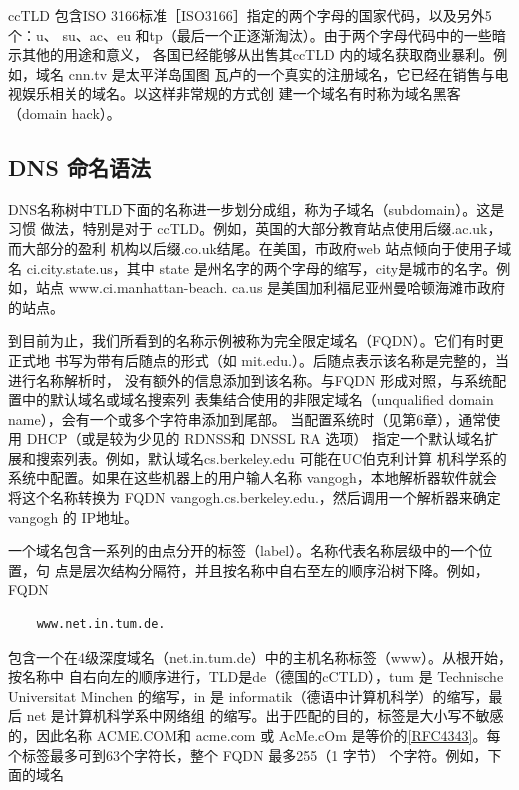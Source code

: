 
ccTLD 包含ISO 3166标准［ISO3166］指定的两个字母的国家代码，以及另外5个：u、
su、ac、eu 和tp（最后一个正逐渐淘汰）。由于两个字母代码中的一些暗示其他的用途和意义，
各国已经能够从出售其ccTLD 内的域名获取商业暴利。例如，域名 cnn.tv 是太平洋岛国图
瓦卢的一个真实的注册域名，它已经在销售与电视娱乐相关的域名。以这样非常规的方式创
建一个域名有时称为域名黑客（domain hack）。

\subsection{DNS 命名语法}

DNS名称树中TLD下面的名称进一步划分成组，称为子域名（subdomain）。这是习惯
做法，特别是对于 ccTLD。例如，英国的大部分教育站点使用后缀.ac.uk，而大部分的盈利
机构以后缀.co.uk结尾。在美国，市政府web 站点倾向于使用子域名 ci.city.state.us，其中
state 是州名字的两个字母的缩写，city是城市的名字。例如，站点 www.ci.manhattan-beach.
ca.us 是美国加利福尼亚州曼哈顿海滩市政府的站点。

到目前为止，我们所看到的名称示例被称为完全限定域名（FQDN）。它们有时更正式地
书写为带有后随点的形式（如 mit.edu.）。后随点表示该名称是完整的，当进行名称解析时，
没有额外的信息添加到该名称。与FQDN 形成对照，与系统配置中的默认域名或域名搜索列
表集结合使用的非限定域名（unqualified domain name），会有一个或多个字符串添加到尾部。
当配置系统时（见第6章），通常使用 DHCP（或是较为少见的 RDNSS和 DNSSL RA 选项）
指定一个默认域名扩展和搜索列表。例如，默认域名cs.berkeley.edu 可能在UC伯克利计算
机科学系的系统中配置。如果在这些机器上的用户输人名称 vangogh，本地解析器软件就会
将这个名称转换为 FQDN vangogh.cs.berkeley.edu.，然后调用一个解析器来确定 vangogh 的
IP地址。

一个域名包含一系列的由点分开的标签（label）。名称代表名称层级中的一个位置，句
点是层次结构分隔符，并且按名称中自右至左的顺序沿树下降。例如，FQDN

\begin{verbatim}
    www.net.in.tum.de.
\end{verbatim}

包含一个在4级深度域名（net.in.tum.de）中的主机名称标签（www）。从根开始，按名称中
自右向左的顺序进行，TLD是de（德国的cCTLD），tum 是 Technische Universitat Minchen
的缩写，in 是 informatik（德语中计算机科学）的缩写，最后 net 是计算机科学系中网络组
的缩写。出于匹配的目的，标签是大小写不敏感的，因此名称 ACME.COM和 acme.com 或
AcMe.cOm 是等价的\href{https://www.rfc-editor.org/rfc/rfc4343}{[RFC4343]}。每个标签最多可到63个字符长，整个 FQDN 最多255（1
字节） 个字符。例如，下面的域名

